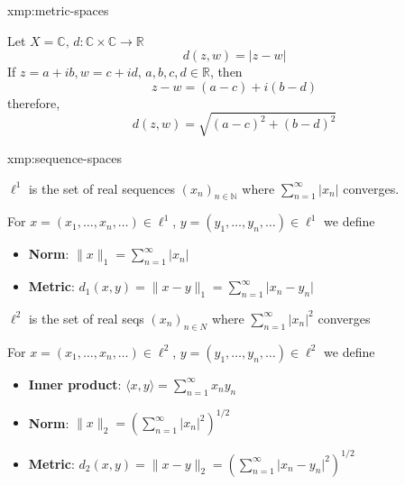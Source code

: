 \documentclass[landscape, 8pt]{extarticle}
\begin{document}
\begin{multicols}{3}
\begin{xmp}{xmp:metric-spaces}{}



    Let $X = \mathbb{C},\, d: \mathbb{C} \times \mathbb{C} \to \mathbb{R} $
    \[d(z,w) = \lvert z - w \rvert\]
    If $z = a+ib, w = c+id,\, a,b,c,d\in\mathbb{R}$, then
    \[z - w = (a - c) + i(b - d)\]
    therefore,
    \[d(z,w) = \sqrt{(a-c)^{2} + (b-d)^{2}}\]

\end{xmp}



\begin{xmp}{xmp:sequence-spaces}{}
    \vspace{-5pt}

    $\ell^{1}$ is the set of real sequences $(x_{n})_{n\in\mathbb{N}}$ where $\sum_{n = 1}^{\infty}\lvert x_{n} \rvert$ converges.

    For $x = (x_{1},\dots,x_{n},\dots)\in \ell^{1}$, $y = (y_{1},\dots,y_{n},\dots)\in \ell^{1}$ we define
    \vspace{-2pt}
    \begin{itemize}[leftmargin=*]
        \item \textbf{Norm}: $\lVert x \rVert_{1} = \sum_{n = 1}^{\infty} \lvert x_{n} \rvert$
        \item \textbf{Metric}: $d_{1}(x, y) = \lVert x - y \rVert_{1} = \sum_{n = 1}^{\infty} \lvert x_{n} - y_{n} \rvert$
    \end{itemize}
        
    \vspace{-2pt}

    $\ell^{2}$ is the set of real seqs $(x_{n})_{n\in N}$ where $\sum_{n = 1}^{\infty} \lvert x_{n} \rvert^{2}$ converges

    For $x = (x_{1},\dots,x_{n},\dots)\in \ell^{2}$, $y = (y_{1},\dots,y_{n},\dots)\in \ell^{2}$ we define
    \vspace{-6pt}

    \begin{itemize}[leftmargin=*]
        \item \textbf{Inner product}: $\langle x, y \rangle = \sum_{n = 1}^{\infty} x_{n}y_{n}$
        \item \textbf{Norm}: $\lVert x \rVert_{2} = \left(\sum_{n = 1}^{\infty}\lvert x_{n} \rvert^{2}\right)^{1 /2}$
        \item \textbf{Metric}: $d_{2}(x, y) = \lVert x - y \rVert_{2} = \left(\sum_{n = 1}^{\infty}\lvert x_{n} - y_{n} \rvert^{2}\right)^{1 /2}$
    \end{itemize}


\end{xmp}
\end{multicols}
\end{document}
